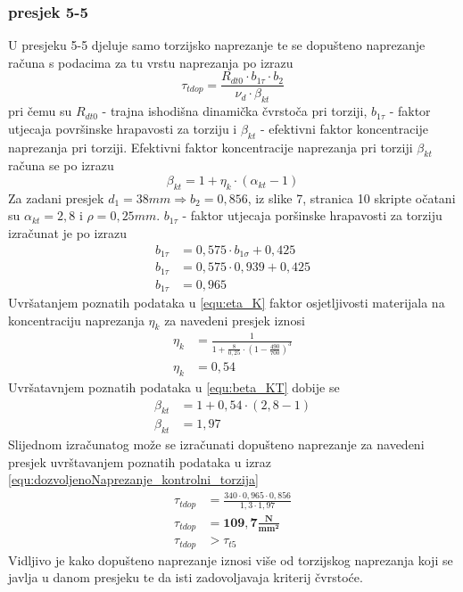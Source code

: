 \documentclass[11pt,a4paper]{article}
\begin{document}
\subsubsection*{presjek 5-5}
U presjeku 5-5 djeluje samo torzijsko naprezanje te se dopušteno naprezanje računa s podacima za tu vrstu naprezanja po izrazu
\begin{equation}
\tau_{tdop}=\frac{R_{dt0} \cdot b_{1 \tau} \cdot b_2}{\nu_d \cdot \beta_{kt}}\label{equ:dozvoljenoNaprezanje_kontrolni_torzija}
\end{equation}
pri čemu su $R_{dt0}$ - trajna ishodišna dinamička čvrstoča pri torziji, $b_{1 \tau}$ - faktor utjecaja površinske hrapavosti za torziju i $\beta_{kt}$ - efektivni faktor koncentracije naprezanja pri torziji.
Efektivni faktor koncentracije naprezanja pri torziji $\beta_{kt}$ računa se po izrazu
\begin{equation}
\beta_{kt}=1+ \eta_k \cdot (\alpha_{kt}-1)\label{equ:beta_KT}
\end{equation}
Za zadani presjek $d_1=38mm \Rightarrow b_2=0,856$, iz slike 7, stranica 10 skripte očatani su $\alpha_{kt}=2,8$ i $\rho=0,25mm$.
$b_{1 \tau}$ - faktor utjecaja poršinske hrapavosti za torziju izračunat je po izrazu
\begin{align*}
b_{1 \tau}&=0,575 \cdot b_{1 \sigma} + 0,425\\
b_{1 \tau}&=0,575 \cdot 0,939 + 0,425\\
b_{1 \tau}&=0,965
\end{align*}
Uvršatanjem poznatih podataka u \eqref{equ:eta_K} faktor osjetljivosti materijala na koncentraciju naprezanja $\eta_k$ za navedeni presjek iznosi
\begin{align*}
\eta_k&=\frac{1}{1+\frac{8}{0,25} \cdot \left( 1- \frac{490}{700} \right)^3}\\
\eta_k&=0,54
\end{align*}
Uvršatavnjem poznatih podataka u \eqref{equ:beta_KT} dobije se
\begin{align*}
\beta_{kt}&=1+ 0,54 \cdot (2,8-1)\\
\beta_{kt}&=1,97
\end{align*}
Slijednom izračunatog može se izračunati dopušteno naprezanje za navedeni presjek uvrštavanjem poznatih podataka u izraz \eqref{equ:dozvoljenoNaprezanje_kontrolni_torzija}
\begin{align*}
\tau_{tdop}&=\frac{340 \cdot 0,965 \cdot 0,856}{1,3 \cdot 1,97}\\
\tau_{tdop}&=\mathbf{109,7\textstyle\frac{N}{mm^2}}\\
\tau_{tdop}&>\tau_{t5}
\end{align*}
Vidljivo je kako dopušteno naprezanje iznosi više od torzijskog naprezanja koji se javlja u danom presjeku te da isti zadovoljavaja kriterij čvrstoće.
\end{document}
